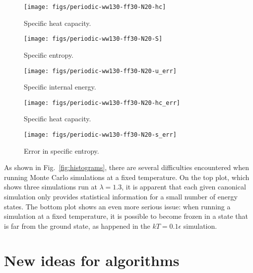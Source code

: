 \documentclass[letterpaper,twocolumn,amsmath,amssymb,pre,aps,10pt]{revtex4-1}
\begin{document}
\begin{figure}
  \texttt{[image: figs/periodic-ww130-ff30-N20-hc]}
  \caption{Specific heat capacity.\label{fig:hc}}
\end{figure}

\begin{figure}
  \texttt{[image: figs/periodic-ww130-ff30-N20-S]}
  \caption{Specific entropy.\label{fig:S}}
\end{figure}

\begin{figure}
  \texttt{[image: figs/periodic-ww130-ff30-N20-u\_err]}
  \caption{Specific internal energy.\label{fig:u}}
\end{figure}

\begin{figure}
  \texttt{[image: figs/periodic-ww130-ff30-N20-hc\_err]}
  \caption{Specific heat capacity.\label{fig:hc}}
\end{figure}

\begin{figure}
  \texttt{[image: figs/periodic-ww130-ff30-N20-s\_err]}
  \caption{Error in specific entropy.\label{fig:Serr}}
\end{figure}


As shown in Fig.~\ref{fig:histograms}, there are several difficulties
encountered when running Monte Carlo simulations at a fixed
temperature.  On the top plot, which shows three simulations run at
$\lambda = 1.3$, it is apparent that each given canonical simulation
only provides statistical information for a small number of energy
states.  The bottom plot shows an even more serious issue: when
running a simulation at a fixed temperature, it is possible to become
frozen in a state that is far from the ground state, as happened in
the $kT=0.1\epsilon$ simulation.

% 

\section{New ideas for algorithms}
\end{document}

